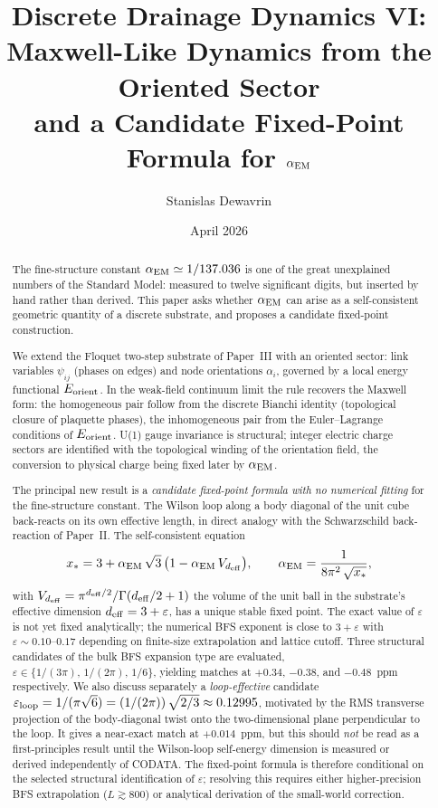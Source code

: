 \documentclass[11pt,a4paper]{article}
\title{\textbf{Discrete Drainage Dynamics VI:\\
Maxwell-Like Dynamics from the Oriented Sector\\
and a Candidate Fixed-Point Formula for $\alpha_{\rm EM}$}}
\author[1]{Stanislas Dewavrin}
\affil[1]{Independent researcher \\ \texttt{dewavrin.iphone@gmail.com}}
\date{April 2026}
\begin{document}
\maketitle

\begin{abstract}
\noindent
The fine-structure constant $\alpha_{\rm EM} \simeq 1/137.036$
is one of the great unexplained numbers of the Standard Model:
measured to twelve significant digits, but inserted by hand
rather than derived. This paper asks whether $\alpha_{\rm EM}$
can arise as a self-consistent geometric quantity of a discrete
substrate, and proposes a candidate fixed-point construction.

We extend the Floquet two-step substrate of Paper~III with an
oriented sector: link variables $\psi_{ij}$ (phases on edges)
and node orientations $\alpha_i$, governed by a local energy
functional $E_{\rm orient}$. In the weak-field continuum limit
the rule recovers the Maxwell form: the homogeneous pair follow
from the discrete Bianchi identity (topological closure of
plaquette phases), the inhomogeneous pair from the
Euler--Lagrange conditions of $E_{\rm orient}$. U(1) gauge
invariance is structural; integer electric charge sectors are
identified with the topological winding of the orientation
field, the conversion to physical charge being fixed later by
$\alpha_{\rm EM}$.

The principal new result is a \emph{candidate fixed-point
formula with no numerical fitting} for the fine-structure
constant. The
Wilson loop along a body diagonal of the unit cube back-reacts
on its own effective length, in direct analogy with the
Schwarzschild back-reaction of Paper~II. The self-consistent
equation
\[
x_* = 3 + \alpha_{\rm EM}\,\sqrt{3}\,
\big(1 - \alpha_{\rm EM}\,V_{d_{\rm eff}}\big),
\qquad
\alpha_{\rm EM} = \frac{1}{8\pi^2\,\sqrt{x_*}},
\]
with $V_{d_{\rm eff}} = \pi^{d_{\rm eff}/2}/\Gamma(d_{\rm eff}/2 + 1)$
the volume of the unit ball in the substrate's effective
dimension $d_{\rm eff} = 3 + \varepsilon$, has a unique stable
fixed point. The exact value of $\varepsilon$ is not yet fixed
analytically; the numerical BFS exponent is close to
$3 + \varepsilon$ with $\varepsilon \sim 0.10\text{--}0.17$
depending on finite-size extrapolation and lattice cutoff. Three structural candidates of the bulk BFS expansion type are
evaluated, $\varepsilon \in \{1/(3\pi),\,1/(2\pi),\,1/6\}$,
yielding matches at $+0.34$, $-0.38$, and $-0.48$~ppm
respectively. We also discuss separately a \emph{loop-effective}
candidate $\varepsilon_{\rm loop} = 1/(\pi\sqrt{6}) =
(1/(2\pi))\,\sqrt{2/3} \approx 0.12995$, motivated by the RMS
transverse projection of the body-diagonal twist onto the
two-dimensional plane perpendicular to the loop. It gives a
near-exact match at $+0.014$~ppm, but this should \emph{not} be
read as a first-principles result until the Wilson-loop
self-energy dimension is measured or derived independently of
CODATA. The fixed-point formula is therefore conditional on the
selected structural identification of $\varepsilon$; resolving this
requires either higher-precision BFS extrapolation
($L \gtrsim 800$) or analytical derivation of the small-world
correction.


\end{abstract}
\end{document}
